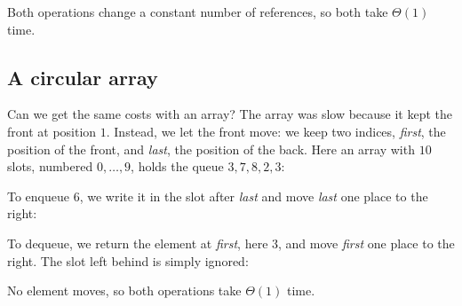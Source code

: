 \documentclass[a4paper,12pt,oneside]{report}
\begin{document}
Both operations change a constant number of references, so both take
$\Theta(1)$ time.

\subsection{A circular array}

Can we get the same costs with an array? The array was slow because
it kept the front at position $1$. Instead, we let the front move: we
keep two indices, \emph{first}, the position of the front, and
\emph{last}, the position of the back. Here an array with $10$ slots,
numbered $0,\ldots,9$, holds the queue $3,7,8,2,3$:
\newcommand{\qarrayrow}[2]{%
  \foreach \i in {0,...,9}
    \draw (\i-0.5,-0.3) rectangle (\i+0.5,0.3);
  \foreach \v [count=\j from #1] in {#2} {
    \draw[fill=PlotBlue!10] (\j-0.5,-0.3) rectangle (\j+0.5,0.3);
    \node at (\j,0) {$\v$};}
  \foreach \i in {0,...,9}
    \node[above,font=\scriptsize,gray!80!black] at (\i,0.3) {$\i$};}
\newcommand{\qarrayptr}[4][]{%
  \draw[->,thick,#1] (#2,-#4) node[below,font=\scriptsize,#1] {#3} -- (#2,-0.35);}
\begin{center}
\end{center}
To enqueue $6$, we write it in the slot after \emph{last} and move
\emph{last} one place to the right:
\begin{center}
\end{center}
To dequeue, we return the element at \emph{first}, here $3$, and move
\emph{first} one place to the right. The slot left behind is simply
ignored:
\begin{center}
\end{center}
No element moves, so both operations take $\Theta(1)$ time.
\end{document}

